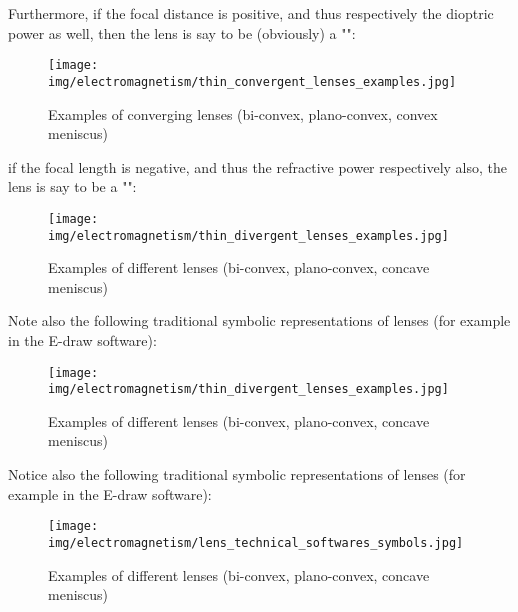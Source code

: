 	Furthermore, if the focal distance is positive, and thus respectively the dioptric power as well, then the lens is say to be (obviously) a "":
	\begin{figure}[H]
		\centering
		\texttt{[image: img/electromagnetism/thin\_convergent\_lenses\_examples.jpg]}
		\caption{Examples of converging lenses (bi-convex, plano-convex, convex meniscus)}
	\end{figure}
	if the focal length is negative, and thus the refractive power respectively also, the lens is say to be a "":
	\begin{figure}[H]
		\centering
		\texttt{[image: img/electromagnetism/thin\_divergent\_lenses\_examples.jpg]}
		\caption{Examples of different lenses (bi-convex, plano-convex, concave meniscus)}
	\end{figure}
	Note also the following traditional symbolic representations of lenses (for example in the E-draw software):
	\begin{figure}[H]
		\centering
		\texttt{[image: img/electromagnetism/thin\_divergent\_lenses\_examples.jpg]}
		\caption{Examples of different lenses (bi-convex, plano-convex, concave meniscus)}
	\end{figure}
	Notice also the following traditional symbolic representations of lenses (for example in the E-draw software):
	\begin{figure}[H]
		\centering
		\texttt{[image: img/electromagnetism/lens\_technical\_softwares\_symbols.jpg]}
		\caption[]{Examples of different lenses (bi-convex, plano-convex, concave meniscus)}
	\end{figure}
	
